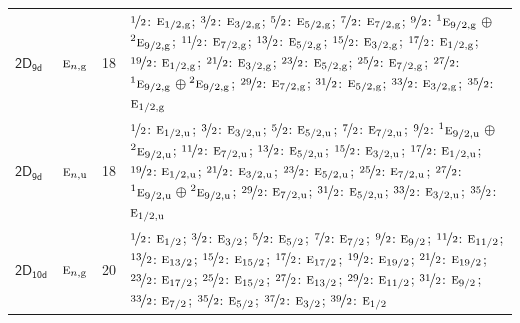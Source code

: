\documentclass[10pt,a4paper]{article}
\numberwithin{equation}{section}
\newcommand{\grp}[1]{\mathsf{#1}}
\newcommand{\irr}[1]{\text{\normalfont\scshape #1}}
\newcommand{\conjpair}[1]{{}^{#1}}
\newcommand{\ptag}[1]{\mathrm{#1}}
\newlength{\fillwidth}\newlength{\cellwidth}\newlength{\colwidth}
\begin{document}
{\begin{longtable}{@{}llr>{\RaggedRight\arraybackslash}p{\fillwidth}@{}}
\href{2D9d.pdf}{$\grp{2D_{9d}}$} & $\irr{e}_{n,\ptag{g}}$ & 18 & $\nicefrac{1}{2}$: $\irr{e}_{1/2,\ptag{g}}$; $\nicefrac{3}{2}$: $\irr{e}_{3/2,\ptag{g}}$; $\nicefrac{5}{2}$: $\irr{e}_{5/2,\ptag{g}}$; $\nicefrac{7}{2}$: $\irr{e}_{7/2,\ptag{g}}$; $\nicefrac{9}{2}$: $\conjpair{1}\irr{e}_{9/2,\ptag{g}}$${}\oplus{}$$\conjpair{2}\irr{e}_{9/2,\ptag{g}}$; $\nicefrac{11}{2}$: $\irr{e}_{7/2,\ptag{g}}$; $\nicefrac{13}{2}$: $\irr{e}_{5/2,\ptag{g}}$; $\nicefrac{15}{2}$: $\irr{e}_{3/2,\ptag{g}}$; $\nicefrac{17}{2}$: $\irr{e}_{1/2,\ptag{g}}$; $\nicefrac{19}{2}$: $\irr{e}_{1/2,\ptag{g}}$; $\nicefrac{21}{2}$: $\irr{e}_{3/2,\ptag{g}}$; $\nicefrac{23}{2}$: $\irr{e}_{5/2,\ptag{g}}$; $\nicefrac{25}{2}$: $\irr{e}_{7/2,\ptag{g}}$; $\nicefrac{27}{2}$: $\conjpair{1}\irr{e}_{9/2,\ptag{g}}$${}\oplus{}$$\conjpair{2}\irr{e}_{9/2,\ptag{g}}$; $\nicefrac{29}{2}$: $\irr{e}_{7/2,\ptag{g}}$; $\nicefrac{31}{2}$: $\irr{e}_{5/2,\ptag{g}}$; $\nicefrac{33}{2}$: $\irr{e}_{3/2,\ptag{g}}$; $\nicefrac{35}{2}$: $\irr{e}_{1/2,\ptag{g}}$\\
\href{2D9d.pdf}{$\grp{2D_{9d}}$} & $\irr{e}_{n,\ptag{u}}$ & 18 & $\nicefrac{1}{2}$: $\irr{e}_{1/2,\ptag{u}}$; $\nicefrac{3}{2}$: $\irr{e}_{3/2,\ptag{u}}$; $\nicefrac{5}{2}$: $\irr{e}_{5/2,\ptag{u}}$; $\nicefrac{7}{2}$: $\irr{e}_{7/2,\ptag{u}}$; $\nicefrac{9}{2}$: $\conjpair{1}\irr{e}_{9/2,\ptag{u}}$${}\oplus{}$$\conjpair{2}\irr{e}_{9/2,\ptag{u}}$; $\nicefrac{11}{2}$: $\irr{e}_{7/2,\ptag{u}}$; $\nicefrac{13}{2}$: $\irr{e}_{5/2,\ptag{u}}$; $\nicefrac{15}{2}$: $\irr{e}_{3/2,\ptag{u}}$; $\nicefrac{17}{2}$: $\irr{e}_{1/2,\ptag{u}}$; $\nicefrac{19}{2}$: $\irr{e}_{1/2,\ptag{u}}$; $\nicefrac{21}{2}$: $\irr{e}_{3/2,\ptag{u}}$; $\nicefrac{23}{2}$: $\irr{e}_{5/2,\ptag{u}}$; $\nicefrac{25}{2}$: $\irr{e}_{7/2,\ptag{u}}$; $\nicefrac{27}{2}$: $\conjpair{1}\irr{e}_{9/2,\ptag{u}}$${}\oplus{}$$\conjpair{2}\irr{e}_{9/2,\ptag{u}}$; $\nicefrac{29}{2}$: $\irr{e}_{7/2,\ptag{u}}$; $\nicefrac{31}{2}$: $\irr{e}_{5/2,\ptag{u}}$; $\nicefrac{33}{2}$: $\irr{e}_{3/2,\ptag{u}}$; $\nicefrac{35}{2}$: $\irr{e}_{1/2,\ptag{u}}$\\
\href{2D10d.pdf}{$\grp{2D_{10d}}$} & $\irr{e}_{n,\ptag{g}}$ & 20 & $\nicefrac{1}{2}$: $\irr{e}_{1/2}$; $\nicefrac{3}{2}$: $\irr{e}_{3/2}$; $\nicefrac{5}{2}$: $\irr{e}_{5/2}$; $\nicefrac{7}{2}$: $\irr{e}_{7/2}$; $\nicefrac{9}{2}$: $\irr{e}_{9/2}$; $\nicefrac{11}{2}$: $\irr{e}_{11/2}$; $\nicefrac{13}{2}$: $\irr{e}_{13/2}$; $\nicefrac{15}{2}$: $\irr{e}_{15/2}$; $\nicefrac{17}{2}$: $\irr{e}_{17/2}$; $\nicefrac{19}{2}$: $\irr{e}_{19/2}$; $\nicefrac{21}{2}$: $\irr{e}_{19/2}$; $\nicefrac{23}{2}$: $\irr{e}_{17/2}$; $\nicefrac{25}{2}$: $\irr{e}_{15/2}$; $\nicefrac{27}{2}$: $\irr{e}_{13/2}$; $\nicefrac{29}{2}$: $\irr{e}_{11/2}$; $\nicefrac{31}{2}$: $\irr{e}_{9/2}$; $\nicefrac{33}{2}$: $\irr{e}_{7/2}$; $\nicefrac{35}{2}$: $\irr{e}_{5/2}$; $\nicefrac{37}{2}$: $\irr{e}_{3/2}$; $\nicefrac{39}{2}$: $\irr{e}_{1/2}$\\

\end{longtable}}
\end{document}
